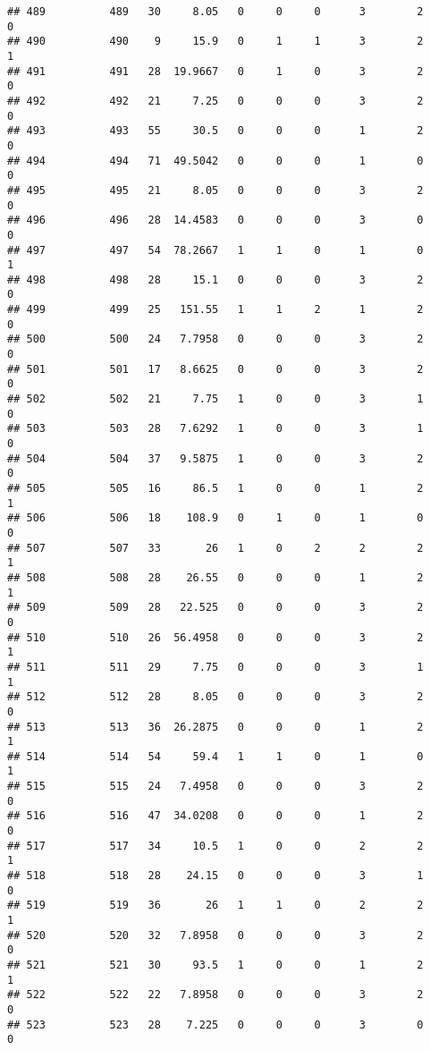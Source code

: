 \documentclass[
]{article}
\begin{document}
\begin{verbatim}
## 489          489   30     8.05   0     0     0      3        2         0
## 490          490    9     15.9   0     1     1      3        2         1
## 491          491   28  19.9667   0     1     0      3        2         0
## 492          492   21     7.25   0     0     0      3        2         0
## 493          493   55     30.5   0     0     0      1        2         0
## 494          494   71  49.5042   0     0     0      1        0         0
## 495          495   21     8.05   0     0     0      3        2         0
## 496          496   28  14.4583   0     0     0      3        0         0
## 497          497   54  78.2667   1     1     0      1        0         1
## 498          498   28     15.1   0     0     0      3        2         0
## 499          499   25   151.55   1     1     2      1        2         0
## 500          500   24   7.7958   0     0     0      3        2         0
## 501          501   17   8.6625   0     0     0      3        2         0
## 502          502   21     7.75   1     0     0      3        1         0
## 503          503   28   7.6292   1     0     0      3        1         0
## 504          504   37   9.5875   1     0     0      3        2         0
## 505          505   16     86.5   1     0     0      1        2         1
## 506          506   18    108.9   0     1     0      1        0         0
## 507          507   33       26   1     0     2      2        2         1
## 508          508   28    26.55   0     0     0      1        2         1
## 509          509   28   22.525   0     0     0      3        2         0
## 510          510   26  56.4958   0     0     0      3        2         1
## 511          511   29     7.75   0     0     0      3        1         1
## 512          512   28     8.05   0     0     0      3        2         0
## 513          513   36  26.2875   0     0     0      1        2         1
## 514          514   54     59.4   1     1     0      1        0         1
## 515          515   24   7.4958   0     0     0      3        2         0
## 516          516   47  34.0208   0     0     0      1        2         0
## 517          517   34     10.5   1     0     0      2        2         1
## 518          518   28    24.15   0     0     0      3        1         0
## 519          519   36       26   1     1     0      2        2         1
## 520          520   32   7.8958   0     0     0      3        2         0
## 521          521   30     93.5   1     0     0      1        2         1
## 522          522   22   7.8958   0     0     0      3        2         0
## 523          523   28    7.225   0     0     0      3        0         0

\end{verbatim}
\end{document}
